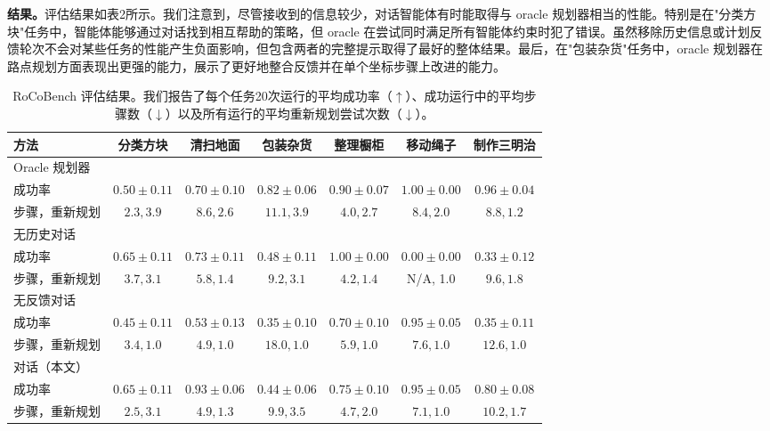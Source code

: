 \documentclass[UTF8, a4paper, 12pt]{article}
\begin{document}
\textbf{结果。}评估结果如表2所示。我们注意到，尽管接收到的信息较少，对话智能体有时能取得与 oracle 规划器相当的性能。特别是在"分类方块"任务中，智能体能够通过对话找到相互帮助的策略，但 oracle 在尝试同时满足所有智能体约束时犯了错误。虽然移除历史信息或计划反馈轮次不会对某些任务的性能产生负面影响，但包含两者的完整提示取得了最好的整体结果。最后，在"包装杂货"任务中，oracle 规划器在路点规划方面表现出更强的能力，展示了更好地整合反馈并在单个坐标步骤上改进的能力。

\begin{table}[htbp]
\centering
\caption{RoCoBench 评估结果。我们报告了每个任务20次运行的平均成功率（$\uparrow$）、成功运行中的平均步骤数（$\downarrow$）以及所有运行的平均重新规划尝试次数（$\downarrow$）。}
\begin{tabular}{lcccccc}
\toprule
方法 & 分类方块 & 清扫地面 & 包装杂货 & 整理橱柜 & 移动绳子 & 制作三明治 \\
\midrule
Oracle 规划器 &  &  &  &  &  &  \\
成功率 & $0.50 \pm 0.11$ & $0.70 \pm 0.10$ & $0.82 \pm 0.06$ & $0.90 \pm 0.07$ & $1.00 \pm 0.00$ & $0.96 \pm 0.04$ \\
步骤，重新规划 & $2.3, 3.9$ & $8.6, 2.6$ & $11.1, 3.9$ & $4.0, 2.7$ & $8.4, 2.0$ & $8.8, 1.2$ \\
\midrule
无历史对话 &  &  &  &  &  &  \\
成功率 & $0.65 \pm 0.11$ & $0.73 \pm 0.11$ & $0.48 \pm 0.11$ & $1.00 \pm 0.00$ & $0.00 \pm 0.00$ & $0.33 \pm 0.12$ \\
步骤，重新规划 & $3.7, 3.1$ & $5.8, 1.4$ & $9.2, 3.1$ & $4.2, 1.4$ & N/A, 1.0 & $9.6, 1.8$ \\
\midrule
无反馈对话 &  &  &  &  &  &  \\
成功率 & $0.45 \pm 0.11$ & $0.53 \pm 0.13$ & $0.35 \pm 0.10$ & $0.70 \pm 0.10$ & $0.95 \pm 0.05$ & $0.35 \pm 0.11$ \\
步骤，重新规划 & $3.4, 1.0$ & $4.9, 1.0$ & $18.0, 1.0$ & $5.9, 1.0$ & $7.6, 1.0$ & $12.6, 1.0$ \\
\midrule
对话（本文） &  &  &  &  &  &  \\
成功率 & $0.65 \pm 0.11$ & $0.93 \pm 0.06$ & $0.44 \pm 0.06$ & $0.75 \pm 0.10$ & $0.95 \pm 0.05$ & $0.80 \pm 0.08$ \\
步骤，重新规划 & $2.5, 3.1$ & $4.9, 1.3$ & $9.9, 3.5$ & $4.7, 2.0$ & $7.1, 1.0$ & $10.2, 1.7$ \\
\bottomrule
\end{tabular}
\end{table}
\end{document}
